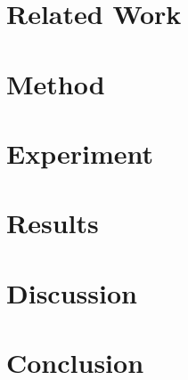 \documentclass[11pt]{article}
\begin{document}
\section{Related Work}
\citet{meyer2023anonymizing} %

\citet{shihao2024adversarial} %

\citet{xiaoyong2019adversarial} %

\citet{goodfellow2015explaining} %

\citet{madry2018towards} %

\citet{gu2019badnets} %

\citet{liu2018trojaning} %

\citet{stefanos2022ultrasonic} %

\citet{stefanos2023jingleback} %

\section{Method}
\citet{kai2022lightweight} %

\section{Experiment}

\section{Results}

\section{Discussion}

\section{Conclusion}



\appendix
\end{document}
